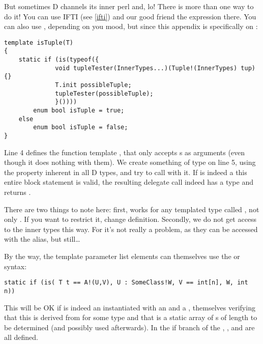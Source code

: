 But sometimes D channels its inner perl and, lo! There is more than one way to do it! You can use IFTI (see \ref{ifti}) and our good friend the \DD{(} expression there. You can also use , depending on you mood, but since this appendix is specifically on :

\begin{verbatim}
template isTuple(T)
{
    static if (is(typeof({
              void tupleTester(InnerTypes...)(Tuple!(InnerTypes) tup) {}
              T.init possibleTuple;
              tupleTester(possibleTuple);
              }())))
        enum bool isTuple = true;
    else
        enum bool isTuple = false;
}
\end{verbatim}

Line 4 defines the function template , that only accepts s as arguments (even though it does nothing with them). We create something of type  on line 5, using the  property inherent in all D types, and try to call  with it. If  is indeed a  this entire block statement is valid, the resulting delegate call indeed has a type and  returns .

There are two things to note here: first,  works for any templated type called , not only . If you want to restrict it, change  definition. Secondly, we do not get access to the inner types this way. For  it's not really a problem, as they can be accessed with the  alias, but still\ldots

By the way, the template parameter list elements can themselves use the  or  syntax:

\begin{verbatim}
static if (is( T t == A!(U,V), U : SomeClass!W, V == int[n], W, int n))
\end{verbatim}

This will be OK if  is indeed an  instantiated with an  and a , themselves verifying that this  is derived from  for some  type and that  is a static array of s of length  to be determined (and possibly used afterwards). In the if branch of the  , ,  and  are all defined. 

